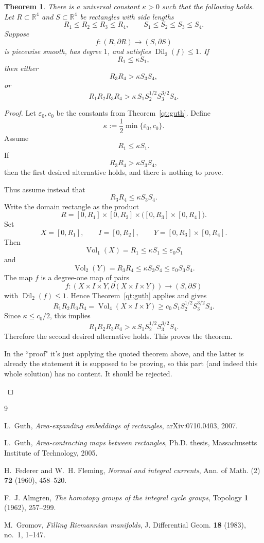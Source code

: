 \documentclass[12pt]{article}
\newtheorem{theorem}{Theorem}
\newcommand{\R}{\mathbb{R}}
\newcommand{\Vol}{\operatorname{Vol}}
\newcommand{\Dil}{\operatorname{Dil}}
\newcommand{\review}[1]{\begin{reviewbox}#1\end{reviewbox}}
\begin{document}
\begin{theorem}\label{thm:main}
There is a universal constant \(\kappa>0\) such that the following holds.
Let \(R\subset \R^4\) and \(S\subset \R^4\) be rectangles with side lengths
\[
R_1\leq R_2\leq R_3\leq R_4,
\qquad
S_1\leq S_2\leq S_3\leq S_4.
\]
Suppose
\[
f:(R,\partial R)\longrightarrow (S,\partial S)
\]
is piecewise smooth, has degree \(1\), and satisfies \(\Dil_2(f)\leq 1\).
If
\[
R_1\leq \kappa S_1,
\]
then either
\[
R_3R_4>\kappa S_3S_4,
\]
or
\[
R_1R_2R_3R_4
>
\kappa\,S_1S_2^{1/2}S_3^{3/2}S_4.
\]
\end{theorem}

\begin{proof}
Let \(\varepsilon_0,c_0\) be the constants from
Theorem~\ref{qt:guth}. Define
\[
\kappa:=\frac12\min\{\varepsilon_0,c_0\}.
\]
Assume
\[
R_1\leq \kappa S_1.
\]
If
\[
R_3R_4>\kappa S_3S_4,
\]
then the first desired alternative holds, and there is nothing to prove.

Thus assume instead that
\[
R_3R_4\leq \kappa S_3S_4.
\]
Write the domain rectangle as the product
\[
R=[0,R_1]\times[0,R_2]\times\bigl([0,R_3]\times[0,R_4]\bigr).
\]
Set
\[
X=[0,R_1],\qquad I=[0,R_2],\qquad
Y=[0,R_3]\times[0,R_4].
\]
Then
\[
\Vol_1(X)=R_1\leq \kappa S_1\leq \varepsilon_0S_1
\]
and
\[
\Vol_2(Y)=R_3R_4\leq \kappa S_3S_4\leq \varepsilon_0S_3S_4.
\]
The map \(f\) is a degree-one map of pairs
\[
f:(X\times I\times Y,\partial(X\times I\times Y))
\longrightarrow (S,\partial S)
\]
with \(\Dil_2(f)\leq 1\). Hence Theorem~\ref{qt:guth} applies and gives
\[
R_1R_2R_3R_4
=
\Vol_4(X\times I\times Y)
\geq
c_0\,S_1S_2^{1/2}S_3^{3/2}S_4.
\]
Since \(\kappa\leq c_0/2\), this implies
\[
R_1R_2R_3R_4
>
\kappa\,S_1S_2^{1/2}S_3^{3/2}S_4.
\]
Therefore the second desired alternative holds. This proves the theorem.
\review{In the ``proof" it's just applying the quoted theorem above, and the latter is already the statement it is supposed to be proving, so this part (and indeed this whole solution) has no content.  It should be rejected.  }


\end{proof}

\begin{thebibliography}{9}

L.~Guth,
\emph{Area-expanding embeddings of rectangles},
arXiv:0710.0403, 2007.

L.~Guth,
\emph{Area-contracting maps between rectangles},
Ph.D. thesis, Massachusetts Institute of Technology, 2005.

H.~Federer and W.~H. Fleming,
\emph{Normal and integral currents},
Ann. of Math. (2) \textbf{72} (1960), 458--520.

F.~J. Almgren,
\emph{The homotopy groups of the integral cycle groups},
Topology \textbf{1} (1962), 257--299.

M.~Gromov,
\emph{Filling Riemannian manifolds},
J. Differential Geom. \textbf{18} (1983), no.~1, 1--147.

\end{thebibliography}
\end{document}
